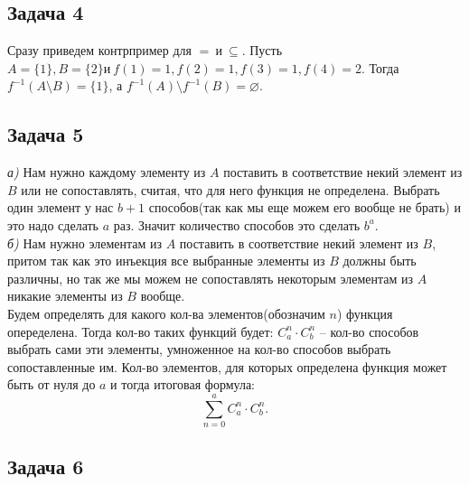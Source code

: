 	\subsection{Задача 4}
	Сразу приведем контрпример для $=\ и\ \subseteq$. Пусть $A = \{1\}, B=\{2\} и\ f(1) = 1, f(2) = 1, f(3) = 1, f(4) = 2$. Тогда $f^{-1}(A \setminus B) = \{1\}$, а $f^{-1}(A) \setminus f^{-1}(B) = \varnothing$. \\
	
	\subsection{Задача 5}
	\textit{а)} Нам нужно каждому элементу из $A$ поставить в соответствие некий элемент из $B$ или не сопоставлять, считая, что для него функция не определена. Выбрать один элемент у нас $b+1$ способов(так как мы еще можем его вообще не брать) и это надо сделать $a$ раз. Значит количество способов это сделать $b^a$.\\
	\textit{б)} Нам нужно элементам из $A$ поставить в соответствие некий элемент из $B$, притом так как это инъекция все выбранные элементы из $B$ должны быть различны, но так же мы можем не сопоставлять некоторым элементам из $A$ никакие элементы из $B$ вообще. \\
	Будем определять для какого кол-ва элементов(обозначим $n$) функция опеределена. Тогда кол-во таких функций будет: $C_{a}^{n} \cdot C_{b}^n$ -- кол-во способов выбрать сами эти элементы, умноженное на кол-во способов выбрать сопоставленные им. Кол-во элементов, для которых определена функция может быть от нуля до $a$ и тогда итоговая формула:
	\[
		\sum_{n=0}^{a}C_{a}^{n} \cdot C_{b}^n.
	\]
	
	\subsection{Задача 6}

